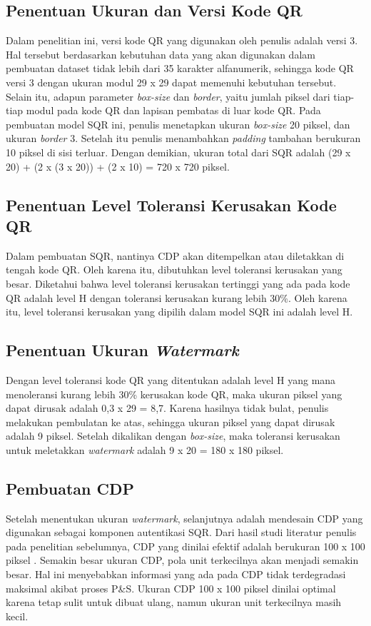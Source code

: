 \subsection{Penentuan Ukuran dan Versi Kode QR}
Dalam penelitian ini, versi kode QR yang digunakan oleh penulis adalah versi 3. Hal tersebut berdasarkan kebutuhan data yang akan digunakan dalam pembuatan
dataset tidak lebih dari 35 karakter alfanumerik, sehingga kode QR versi 3 dengan ukuran modul 29 x 29 dapat memenuhi kebutuhan tersebut. Selain itu, adapun
parameter \emph{box-size} dan \emph{border}, yaitu jumlah piksel dari tiap-tiap modul pada kode QR dan lapisan pembatas di luar kode QR. Pada pembuatan model
SQR ini, penulis menetapkan ukuran \emph{box-size} 20 piksel, dan ukuran \emph{border} 3. Setelah itu penulis menambahkan \emph{padding} tambahan berukuran 10
piksel di sisi terluar. Dengan demikian, ukuran total dari SQR adalah (29 x 20) + (2 x (3 x 20)) + (2 x 10) = 720 x 720 piksel.

\subsection{Penentuan Level Toleransi Kerusakan Kode QR}
Dalam pembuatan SQR, nantinya CDP akan ditempelkan atau diletakkan di tengah kode QR. Oleh karena itu, dibutuhkan level toleransi kerusakan yang besar.
Diketahui bahwa level toleransi kerusakan tertinggi yang ada pada kode QR adalah level H dengan toleransi kerusakan kurang lebih 30\%. Oleh karena itu, level
toleransi kerusakan yang dipilih dalam model SQR ini adalah level H.

\subsection{Penentuan Ukuran \emph{Watermark}}
Dengan level toleransi kode QR yang ditentukan adalah level H yang mana menoleransi kurang lebih 30\% kerusakan kode QR, maka ukuran piksel yang dapat dirusak adalah 0,3 x 29 = 8,7. Karena hasilnya tidak bulat, penulis melakukan pembulatan ke atas, sehingga ukuran piksel yang dapat dirusak adalah 9 piksel. Setelah dikalikan dengan \emph{box-size}, maka toleransi kerusakan untuk meletakkan \emph{watermark} adalah 9 x 20 = 180 x 180 piksel.

\subsection{Pembuatan CDP}
Setelah menentukan ukuran \emph{watermark}, selanjutnya adalah mendesain CDP yang digunakan sebagai komponen autentikasi SQR. Dari hasil studi literatur
penulis pada penelitian sebelumnya, CDP yang dinilai efektif adalah berukuran 100 x 100 piksel \cite{PICARDCANCOPYDETECTIONPATTERN}. Semakin besar ukuran CDP,
pola unit terkecilnya akan menjadi semakin besar. Hal ini menyebabkan informasi yang ada pada CDP tidak terdegradasi maksimal akibat proses P\&S. Ukuran CDP
100 x 100 piksel dinilai optimal karena tetap sulit untuk dibuat ulang, namun ukuran unit terkecilnya masih kecil.


